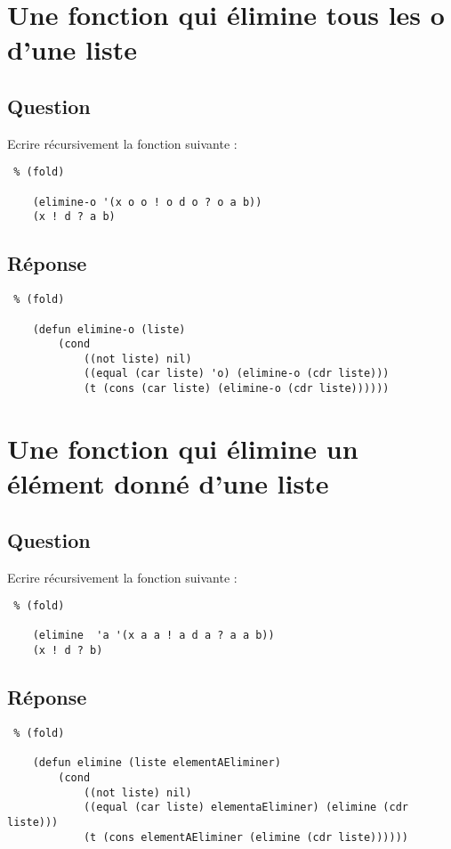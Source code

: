 \documentclass[a4paper, 11pt]{article}
\begin{document}

\section{Une fonction qui élimine tous les o d'une liste} %
\label{sec:Une fonction qui élimine tous les o d'une liste}
\subsection{Question} %
\label{sub:Question}
Ecrire récursivement la fonction suivante :
\begin{lstlisting} % (fold)

    (elimine-o '(x o o ! o d o ? o a b))
    (x ! d ? a b)
\end{lstlisting}
\subsection{Réponse} %
\label{sub:Réponse}
\begin{lstlisting} % (fold)

    (defun elimine-o (liste)
        (cond
            ((not liste) nil)
            ((equal (car liste) 'o) (elimine-o (cdr liste)))
            (t (cons (car liste) (elimine-o (cdr liste))))))
\end{lstlisting}


\section{Une fonction qui élimine un élément donné d'une liste} %
\label{sec:Une fonction qui élimine un élément donné d'une liste}
\subsection{Question} %
\label{sub:Question}
Ecrire récursivement la fonction suivante :
\begin{lstlisting} % (fold)

    (elimine  'a '(x a a ! a d a ? a a b))
    (x ! d ? b)
\end{lstlisting}
\subsection{Réponse} %
\label{sub:Réponse}
\begin{lstlisting} % (fold)

    (defun elimine (liste elementAEliminer)
        (cond
            ((not liste) nil)
            ((equal (car liste) elementaEliminer) (elimine (cdr liste)))
            (t (cons elementAEliminer (elimine (cdr liste))))))
\end{lstlisting}

%
\end{document}
